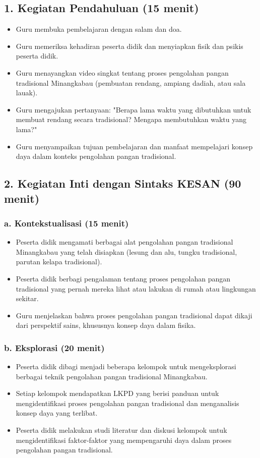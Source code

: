 \documentclass[12pt,a4paper]{article}
\begin{document}
\subsection*{1. Kegiatan Pendahuluan (15 menit)}
\begin{itemize}[leftmargin=*]
    \item Guru membuka pembelajaran dengan salam dan doa.
    \item Guru memeriksa kehadiran peserta didik dan menyiapkan fisik dan psikis peserta didik.
    \item Guru menayangkan video singkat tentang proses pengolahan pangan tradisional Minangkabau (pembuatan rendang, ampiang dadiah, atau sala lauak).
    \item Guru mengajukan pertanyaan: "Berapa lama waktu yang dibutuhkan untuk membuat rendang secara tradisional? Mengapa membutuhkan waktu yang lama?"
    \item Guru menyampaikan tujuan pembelajaran dan manfaat mempelajari konsep daya dalam konteks pengolahan pangan tradisional.
\end{itemize}

\subsection*{2. Kegiatan Inti dengan Sintaks KESAN (90 menit)}

\subsubsection*{a. Kontekstualisasi (15 menit)}
\begin{itemize}[leftmargin=*]
    \item Peserta didik mengamati berbagai alat pengolahan pangan tradisional Minangkabau yang telah disiapkan (lesung dan alu, tungku tradisional, parutan kelapa tradisional).
    \item Peserta didik berbagi pengalaman tentang proses pengolahan pangan tradisional yang pernah mereka lihat atau lakukan di rumah atau lingkungan sekitar.
    \item Guru menjelaskan bahwa proses pengolahan pangan tradisional dapat dikaji dari perspektif sains, khususnya konsep daya dalam fisika.
\end{itemize}

\subsubsection*{b. Eksplorasi (20 menit)}
\begin{itemize}[leftmargin=*]
    \item Peserta didik dibagi menjadi beberapa kelompok untuk mengeksplorasi berbagai teknik pengolahan pangan tradisional Minangkabau.
    \item Setiap kelompok mendapatkan LKPD yang berisi panduan untuk mengidentifikasi proses pengolahan pangan tradisional dan menganalisis konsep daya yang terlibat.
    \item Peserta didik melakukan studi literatur dan diskusi kelompok untuk mengidentifikasi faktor-faktor yang mempengaruhi daya dalam proses pengolahan pangan tradisional.
\end{itemize}
\end{document}
